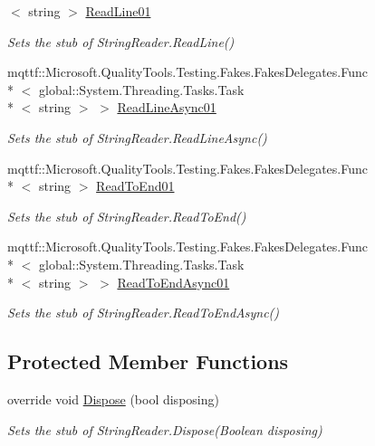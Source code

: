 \begin{DoxyCompactItemize}
$<$ string $>$ \hyperlink{class_system_1_1_i_o_1_1_fakes_1_1_stub_string_reader_a9476ae9572e6d6fe3b626b6b58448786}{Read\-Line01}
\begin{DoxyCompactList}\small\item\em Sets the stub of String\-Reader.\-Read\-Line()\end{DoxyCompactList}\item 
mqttf\-::\-Microsoft.\-Quality\-Tools.\-Testing.\-Fakes.\-Fakes\-Delegates.\-Func\\*
$<$ global\-::\-System.\-Threading.\-Tasks.\-Task\\*
$<$ string $>$ $>$ \hyperlink{class_system_1_1_i_o_1_1_fakes_1_1_stub_string_reader_ace0a88b1c1965b0550c772893ec166bb}{Read\-Line\-Async01}
\begin{DoxyCompactList}\small\item\em Sets the stub of String\-Reader.\-Read\-Line\-Async()\end{DoxyCompactList}\item 
mqttf\-::\-Microsoft.\-Quality\-Tools.\-Testing.\-Fakes.\-Fakes\-Delegates.\-Func\\*
$<$ string $>$ \hyperlink{class_system_1_1_i_o_1_1_fakes_1_1_stub_string_reader_a72b7ce7c8b6fc7d6721b426d12f7a7bc}{Read\-To\-End01}
\begin{DoxyCompactList}\small\item\em Sets the stub of String\-Reader.\-Read\-To\-End()\end{DoxyCompactList}\item 
mqttf\-::\-Microsoft.\-Quality\-Tools.\-Testing.\-Fakes.\-Fakes\-Delegates.\-Func\\*
$<$ global\-::\-System.\-Threading.\-Tasks.\-Task\\*
$<$ string $>$ $>$ \hyperlink{class_system_1_1_i_o_1_1_fakes_1_1_stub_string_reader_a08a04cc3cd3df9b86524fd691b34b1d7}{Read\-To\-End\-Async01}
\begin{DoxyCompactList}\small\item\em Sets the stub of String\-Reader.\-Read\-To\-End\-Async()\end{DoxyCompactList}\end{DoxyCompactItemize}
\subsection*{Protected Member Functions}
\begin{DoxyCompactItemize}
\item 
override void \hyperlink{class_system_1_1_i_o_1_1_fakes_1_1_stub_string_reader_a7344b858163029aa4fb7ede50a8205fb}{Dispose} (bool disposing)
\begin{DoxyCompactList}\small\item\em Sets the stub of String\-Reader.\-Dispose(\-Boolean disposing)\end{DoxyCompactList}\end{DoxyCompactItemize}
